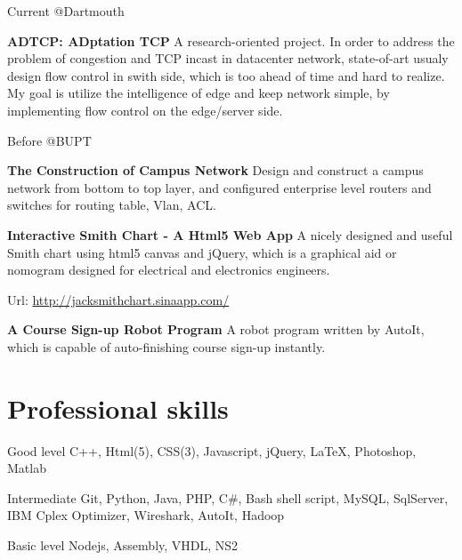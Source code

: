 \documentclass{tccv}
\begin{document}
\begin{eventlist}
\if
\item{Current}
     {@Dartmouth}
     {}
     
     \textbf{ADTCP: ADptation TCP}\newline
     A research-oriented project. In order to address the problem of congestion and TCP incast in datacenter network, state-of-art usualy design flow control in swith side, which is too ahead of time and hard to realize. My goal is utilize the intelligence of edge and keep network simple, by implementing flow control on the edge/server side.
\fi

\item{Before}
     {@BUPT}
     {}     
     
     \textbf{The Construction of Campus Network}\newline
     Design and construct a campus network from bottom to top layer, and configured enterprise level routers and switches for routing table, Vlan, ACL.\newline

     \textbf{Interactive Smith Chart - A Html5 Web App}\newline
     A nicely designed and useful Smith chart using html5 canvas and jQuery, which is a graphical aid or nomogram designed for electrical and electronics engineers.\newline
     
     Url: \underline{http://jacksmithchart.sinaapp.com/}\newline

     \textbf{A Course Sign-up Robot Program}\newline
     A robot program written by AutoIt, which is capable of auto-finishing course sign-up instantly.

\end{eventlist}












\section{Professional skills}

\begin{factlist}

\item{Good level}
     {C++, Html(5), CSS(3), Javascript, jQuery, \LaTeX, Photoshop, Matlab}

\item{Intermediate}
     {Git, Python, Java, PHP, C\#, Bash shell script, MySQL, SqlServer, IBM Cplex Optimizer, Wireshark, AutoIt, Hadoop}

\item{Basic level}
     {Nodejs, Assembly, VHDL, NS2}

\end{factlist}
\end{document}
